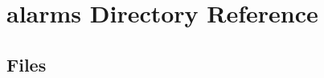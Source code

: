 \section{alarms Directory Reference}
\label{dir_d72295b861ac4f578ac3263b3304fe25}
\subsection*{Files}
\begin{DoxyCompactItemize}
\end{DoxyCompactItemize}
